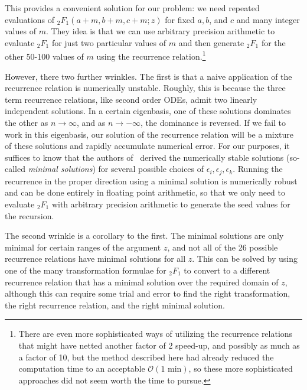 This provides a convenient solution for our problem: we need repeated
evaluations of ${_2F_1}(a+m, b+m, c+m; z)$
for fixed $a,b$, and $c$ and many integer values of $m$.
They idea is that we can use arbitrary precision arithmetic to evaluate
${_2F_1}$ for just two particular values of $m$ and then generate
${_2F_1}$ for the other 50-100 values of $m$ using the recurrence
relation.\footnote{
There are even more sophisticated ways of utilizing the recurrence
relations that might have netted another factor of 2 speed-up, and
possibly as much as a factor of 10, but the method described here had
already reduced the computation time to an acceptable
$\mathcal{O}(\text{1 min})$, so these more sophisticated approaches did
not seem worth the time to pursue.
}

However, there two further wrinkles.
The first is that
a naive application of the recurrence relation is numerically unstable.
Roughly, this is because the three term recurrence relations,
like second order ODEs, admit two linearly independent solutions.
In a certain eigenbasis, one of these solutions dominates the other
as $n\rightarrow\infty$, and as $n\rightarrow-\infty$,
the dominance is reversed.
If we fail to work in this eigenbasis, our solution of the recurrence relation
will be a mixture of these solutions and rapidly accumulate numerical error.
For our purposes, it suffices to know that the authors of~\cite{Gil2007}
derived the numerically stable solutions (so-called \textit{minimal solutions})
for several possible choices of $\epsilon_i, \epsilon_j, \epsilon_k$.
Running the recurrence in the proper direction using a minimal solution
is numerically robust and can be done entirely in floating point arithmetic, 
so that we only need to evaluate ${_2F_1}$ with arbitrary precision arithmetic
to generate the seed values for the recursion.

The second wrinkle is a corollary to the first.
The minimal solutions are only minimal for certain ranges of the argument $z$,
and not all of the 26 possible recurrence relations
have minimal solutions for all $z$.
This can be solved by using one of the many transformation formulae for
${_2F_1}$ to convert to a different recurrence relation that has
a minimal solution over the required domain of $z$, although
this can require some trial and error to find the right transformation,
the right recurrence relation, and the right minimal solution.

